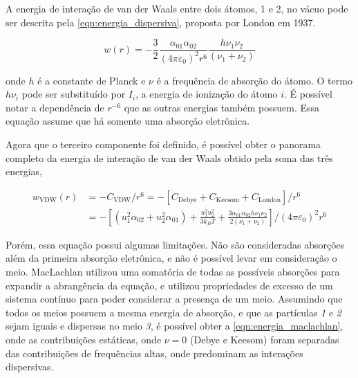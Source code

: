 	A energia de interação de van der Waals entre dois átomos, 1 e 2,  no vácuo pode ser descrita pela \autoref{eqn:energia_dispersiva}, proposta por London em 1937.\cite{London1937}
	
	\begin{equation}
		w(r) = - \frac { 3 } { 2 } \frac { \alpha _ { 01 } \alpha _ { 02 } } { \left( 4 \pi \varepsilon _ { 0 } \right) ^ { 2 } r ^ { 6 } } \frac { h \nu _ { 1 } \nu _ { 2 } } { \left( \nu _ { 1 } + \nu _ { 2 } \right) }
		\label{eqn:energia_dispersiva}
	\end{equation} 
	
	\noindent onde \(h\) é a constante de Planck e \(\nu\) é a frequência de absorção do átomo. O termo \(h\nu_i\) pode ser substituído por \(I_i\), a energia de ionização do átomo \(i\). É possível notar a dependência de \(r^{-6}\) que as outras energias também possuem. Essa equação assume que há somente uma absorção eletrônica. 
	
	Agora que o terceiro componente foi definido, é possível obter o panorama completo da energia de interação de van der Waals obtido pela soma das três energias,
	
	\begin{subequations}
	\begin{align}
		w_{\mathrm{VDW}}(r) &= -C_{\mathrm{VDW}}/r^{6} = -\left[C_{\mathrm{Debye}}+C_{\mathrm{Keesom}}+C_{\mathrm{London}}\right]/r^{6} \label{eqn:vdw_geral} \\
							&= - \left[ \left( u_{1}^{2}\alpha_{02} + u_{2}^{2}\alpha_{01} \right)   + \frac{u_{1}^{2}u_{2}^{2}}{3k_BT} + \frac{3\alpha_{01}\alpha_{02}h\nu_{1}\nu_{2}}{2\left(\nu_{1} + \nu_{2}\right)}\right]/\left(4\pi\varepsilon_{0}\right)^{2}r^{6} \label{eqn:vdw_completa}
	\end{align}
	\label{eqn:vdw}
	\end{subequations} 
	
	Porém, essa equação possui algumas limitações. Não são consideradas absorções além da primeira absorção eletrônica, e não é possível levar em consideração o meio. MacLachlan utilizou uma somatória de todas as possíveis absorções para expandir a abrangência da equação, e utilizou propriedades de excesso de um sistema contínuo para poder considerar a presença de um meio. Assumindo que todos os meios possuem a mesma energia de absorção, e que as partículas \emph{1} e \emph{2} sejam iguais e dispersas no meio \emph{3}, é possível obter a \autoref{eqn:energia_maclachlan}, onde as contribuições estáticas, onde \(\nu = 0\) (Debye e Keesom) foram separadas das contribuições de frequências altas, onde predominam as interações dispersivas.
	
